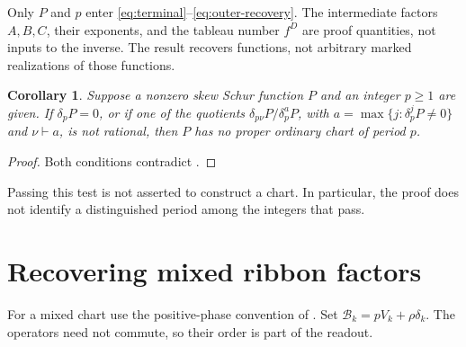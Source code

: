\documentclass[11pt,a4paper]{amsart}
\numberwithin{equation}{section}
\theoremstyle{plain}
\newtheorem{corollary}[theorem]{Corollary}
\theoremstyle{definition}
\begin{document}
Only \(P\) and \(p\) enter \eqref{eq:terminal}--\eqref{eq:outer-recovery}.  The intermediate factors \(A,B,C\), their exponents, and the tableau number \(f^D\) are proof quantities, not inputs to the inverse.  The result recovers functions, not arbitrary marked realizations of those functions.

\begin{corollary}\label{cor:period-test}
Suppose a nonzero skew Schur function \(P\) and an integer \(p\ge1\) are given.  If \(\delta_pP=0\), or if one of the quotients \(\delta_{p\nu}P/\delta_p^aP\), with \(a=\max\{j:\delta_p^jP\ne0\}\) and \(\nu\vdash a\), is not rational, then \(P\) has no proper ordinary chart of period \(p\).
\end{corollary}
\begin{proof}
Both conditions contradict .
\end{proof}

Passing this test is not asserted to construct a chart.  In particular, the proof does not identify a distinguished period among the integers that pass.

\section{Recovering mixed ribbon factors}\label{sec:mixed-extraction}

For a mixed chart use the positive-phase convention of .  Set \(\mathcal B_k=pV_k+\rho\delta_k\).  The operators need not commute, so their order is part of the readout.
\end{document}
